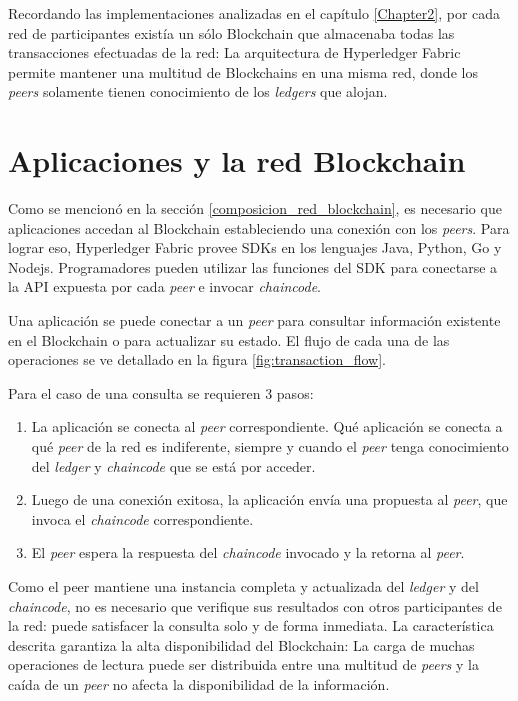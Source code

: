 Recordando las implementaciones analizadas en el capítulo \ref{Chapter2}, por cada red de participantes existía un sólo Blockchain que almacenaba todas las transacciones efectuadas de la red: La arquitectura de Hyperledger Fabric permite mantener una multitud de Blockchains en una misma red, donde los \textit{peers}  solamente tienen conocimiento de los \textit{ledgers}  que alojan.

\section{Aplicaciones y la red Blockchain}
\label{sec:aplicaciones_y_redBC}

Como se mencionó en la sección \ref{composicion_red_blockchain}, es necesario que aplicaciones accedan al Blockchain estableciendo una conexión con los \textit{peers}. Para lograr eso, Hyperledger Fabric provee SDKs en los lenguajes Java, Python, Go y Nodejs. Programadores pueden utilizar las funciones del SDK para conectarse a la API expuesta por cada \textit{peer} e invocar \textit{chaincode}.

Una aplicación se puede conectar a un \textit{peer} para consultar información existente en el Blockchain o para actualizar su estado. El flujo de cada una de las operaciones se ve detallado en la figura \ref{fig:transaction_flow}.

Para el caso de una consulta se requieren 3 pasos:
\begin{enumerate}
    \item La aplicación se conecta al \textit{peer} correspondiente. Qué aplicación se conecta a qué \textit{peer} de la red es indiferente, siempre y cuando el \textit{peer} tenga conocimiento del \textit{ledger} y \textit{chaincode} que se está por acceder.
    \item Luego de una conexión exitosa, la aplicación envía una propuesta al \textit{peer}, que invoca el \textit{chaincode} correspondiente.
    \item El \textit{peer} espera la respuesta del \textit{chaincode} invocado y la retorna al \textit{peer}.
\end{enumerate}
Como el peer mantiene una instancia completa y actualizada del \textit{ledger} y del \textit{chaincode}, no es necesario que verifique sus resultados con otros participantes de la red: puede satisfacer la consulta solo y de forma inmediata. La característica descrita garantiza la alta disponibilidad del Blockchain: La carga de muchas operaciones de lectura puede ser distribuida entre una multitud de \textit{peers} y la caída de un \textit{peer} no afecta la disponibilidad de la información.

